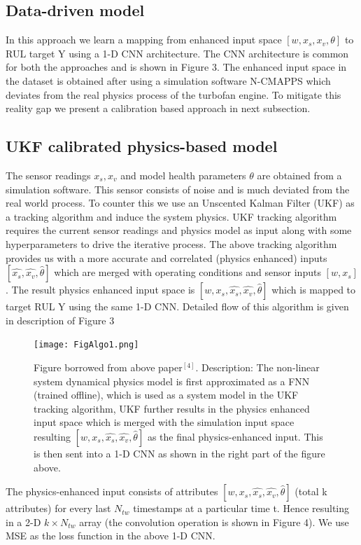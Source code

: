 \documentclass[a4paper,12pt]{article}
\begin{document}
\subsection{Data-driven model}
In this approach we learn a mapping from enhanced input space \([w, x_{s}, x_{v},\theta]\) to RUL target Y using a 1-D CNN architecture. The CNN architecture is common for both the approaches and is shown in Figure 3. The enhanced input space in the dataset is obtained after using a simulation software N-CMAPPS which deviates from the real physics process of the turbofan engine. To mitigate this reality gap we present a calibration based approach in next subsection. 
\subsection{UKF calibrated physics-based model}
The sensor readings \(x_{s}, x_{v}\) and model health parameters \(\theta\) are obtained from a simulation software. This sensor consists of noise and is much deviated from the real world process. To counter this we use an Unscented Kalman Filter (UKF) as a tracking algorithm and induce the system physics. UKF tracking algorithm requires the current sensor readings and physics model as input along with some hyperparameters to drive the iterative process.
The above tracking algorithm provides us with a more accurate and correlated (physics enhanced) inputs \([\hat{x_{s}},\hat{x_{v}},\hat{\theta}]\) which are merged with operating conditions and sensor inputs \([w,x_{s}]\) . The result physics enhanced input space is \([w,x_{s},\hat{x_{s}},\hat{x_{v}},\hat{\theta}]\) which is mapped to target RUL Y using the same 1-D CNN. Detailed flow of this algorithm is given in description of Figure 3

\begin{figure}[h]
\centering
\texttt{[image: FigAlgo1.png]}
\caption{Figure borrowed from above paper\(^{[4]}\). Description: The non-linear system dynamical physics model is first approximated as  a FNN (trained offline), which is used as a system model in the UKF tracking algorithm, UKF further results in the physics enhanced input space which is merged with the simulation input space resulting  \([w,x_{s},\hat{x_{s}},\hat{x_{v}},\hat{\theta}]\) as the final physics-enhanced input. This is then sent into a 1-D CNN as shown in the right part of the figure above.}
\end{figure}

The physics-enhanced input consists of attributes \([w,x_{s},\hat{x_{s}},\hat{x_{v}},\hat{\theta}]\)  (total k attributes) for every last \(N_{tw}\) timestamps at a particular time t. Hence resulting in a 2-D \(k \times N_{tw}\) array (the convolution operation is shown in Figure 4). We use MSE as the loss function in the above 1-D CNN.
\end{document}
